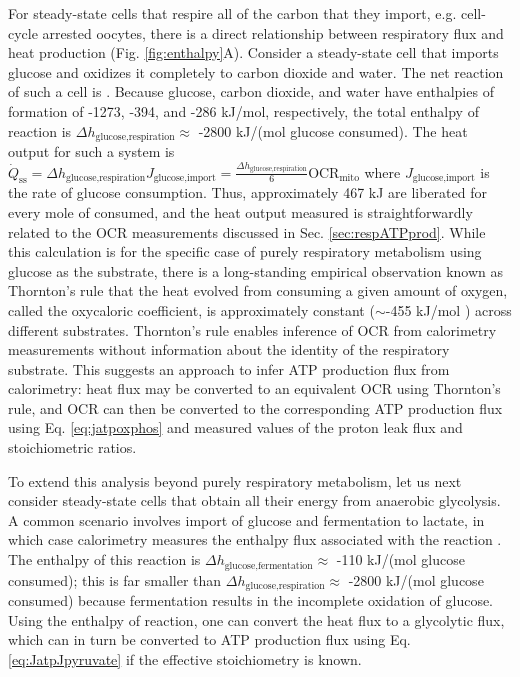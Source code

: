 \documentclass{compactarticle}
\begin{document}
For steady-state cells that respire all of the carbon that they import, e.g. cell-cycle arrested oocytes, there is a direct relationship between respiratory flux and heat production (Fig. \ref{fig:enthalpy}A). Consider a steady-state cell that imports glucose and oxidizes it completely to carbon dioxide and water. The net reaction of such a cell is . Because glucose, carbon dioxide, and water have enthalpies of formation of -1273, -394, and -286 kJ/mol, respectively, the total enthalpy of reaction is $\Delta h_\text{glucose,respiration} \approx$ -2800 kJ/(mol glucose consumed). The heat output for such a system is
$\dot{Q}_\text{ss} = \Delta h_\text{glucose,respiration}  J_\text{glucose,import} = \frac{\Delta h_\text{glucose,respiration}}{6} \text{OCR}_\text{mito}$ where $J_\text{glucose,import}$ is the rate of glucose consumption. Thus, approximately 467 kJ are liberated for every mole of  consumed, and the heat output measured is straightforwardly related to the OCR measurements discussed in Sec. \ref{sec:respATPprod}. While this calculation is for the specific case of purely respiratory metabolism using glucose as the substrate, there is a long-standing empirical observation known as Thornton's rule \cite{thornton_xv_1917} that the heat evolved from consuming a given amount of oxygen, called the oxycaloric coefficient, is approximately constant ($\sim$-455 kJ/mol ) across different substrates. Thornton's rule enables inference of OCR from calorimetry measurements without information about the identity of the respiratory substrate. This suggests an approach to infer ATP production flux from calorimetry: heat flux may be converted to an equivalent OCR using Thornton's rule, and OCR can then be converted to the corresponding ATP production flux using Eq. \ref{eq:jatpoxphos} and measured values of the proton leak flux and stoichiometric ratios.
 
To extend this analysis beyond purely respiratory metabolism, let us next consider steady-state cells that obtain all their energy from anaerobic glycolysis. A common scenario involves import of glucose and fermentation to lactate, in which case calorimetry measures the enthalpy flux associated with the reaction . The enthalpy of this reaction is $\Delta h_\text{glucose,fermentation} \approx$ -110 kJ/(mol glucose consumed); this is far smaller than $\Delta h_\text{glucose,respiration} \approx$ -2800 kJ/(mol glucose consumed) because fermentation results in the incomplete oxidation of glucose. Using the enthalpy of reaction, one can convert the heat flux to a glycolytic flux, which can in turn be converted to ATP production flux using Eq. \ref{eq:JatpJpyruvate} if the effective stoichiometry is known.
 
\end{document}
